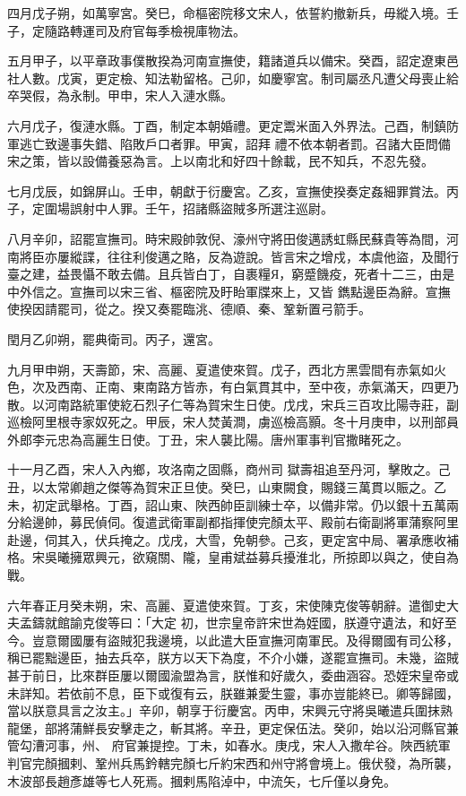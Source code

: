 \begin{pinyinscope}
 四月戊子朔，如萬寧宮。癸巳，命樞密院移文宋人，依誓約撤新兵，毋縱入境。壬子，定隨路轉運司及府官每季檢視庫物法。



 五月甲子，以平章政事僕散揆為河南宣撫使，籍諸道兵以備宋。癸酉，詔定遼東邑社人數。戊寅，更定檢、知法勒留格。己卯，如慶寧宮。制司屬丞凡遭父母喪止給卒哭假，為永制。甲申，宋人入漣水縣。



 六月戊子，復漣水縣。丁酉，制定本朝婚禮。更定鬻米面入外界法。己酉，制鎮防軍逃亡致邊事失錯、陷敗戶口者罪。甲寅，詔拜
 禮不依本朝者罰。召諸大臣問備宋之策，皆以設備養惡為言。上以南北和好四十餘載，民不知兵，不忍先發。



 七月戊辰，如錦屏山。壬申，朝獻于衍慶宮。乙亥，宣撫使揆奏定姦細罪賞法。丙子，定圍場誤射中人罪。壬午，招諸縣盜賊多所選注巡尉。



 八月辛卯，詔罷宣撫司。時宋殿帥敦倪、濠州守將田俊邁誘虹縣民蘇貴等為間，河南將臣亦屢縱諜，往往利俊邁之賂，反為遊說。皆言宋之增戍，本虞他盜，及聞行臺之建，益畏懾不敢去備。且兵皆白丁，自裹糧Я，窮蹙饑疫，死者十二三，由是中外信之。宣撫司以宋三省、樞密院及盱眙軍牒來上，又皆
 鐫點邊臣為辭。宣撫使揆因請罷司，從之。揆又奏罷臨洮、德順、秦、鞏新置弓箭手。



 閏月乙卯朔，罷典衛司。丙子，還宮。



 九月甲申朔，天壽節，宋、高麗、夏遣使來賀。戊子，西北方黑雲間有赤氣如火色，次及西南、正南、東南路方皆赤，有白氣貫其中，至中夜，赤氣滿天，四更乃散。以河南路統軍使紇石烈子仁等為賀宋生日使。戊戌，宋兵三百攻比陽寺莊，副巡檢阿里根寺家奴死之。甲辰，宋人焚黃澗，虜巡檢高顥。冬十月庚申，以刑部員外郎李元忠為高麗生日使。丁丑，宋人襲比陽。唐州軍事判官撒睹死之。



 十一月乙酉，宋人入內鄉，攻洛南之固縣，商州司
 獄壽祖追至丹河，擊敗之。己丑，以太常卿趙之傑等為賀宋正旦使。癸巳，山東闕食，賜錢三萬貫以賑之。乙未，初定武舉格。丁酉，詔山東、陜西帥臣訓練士卒，以備非常。仍以銀十五萬兩分給邊帥，募民偵伺。復遣武衛軍副都指揮使完顏太平、殿前右衛副將軍蒲察阿里赴邊，伺其入，伏兵掩之。戊戌，大雪，免朝參。己亥，更定宮中局、署承應收補格。宋吳曦擁眾興元，欲窺關、隴，皇甫斌益募兵擾淮北，所掠即以與之，使自為戰。



 六年春正月癸未朔，宋、高麗、夏遣使來賀。丁亥，宋使陳克俊等朝辭。遣御史大夫孟鑄就館諭克俊等曰：「大定
 初，世宗皇帝許宋世為姪國，朕遵守遺法，和好至今。豈意爾國屢有盜賊犯我邊境，以此遣大臣宣撫河南軍民。及得爾國有司公移，稱已罷黜邊臣，抽去兵卒，朕方以天下為度，不介小嫌，遂罷宣撫司。未幾，盜賊甚于前日，比來群臣屢以爾國渝盟為言，朕惟和好歲久，委曲涵容。恐姪宋皇帝或未詳知。若依前不息，臣下或復有云，朕雖兼愛生靈，事亦豈能終已。卿等歸國，當以朕意具言之汝主。」辛卯，朝享于衍慶宮。丙申，宋興元守將吳曦遣兵圍抹熟龍堡，部將蒲鮮長安擊走之，斬其將。辛丑，更定保伍法。癸卯，始以沿河縣官兼管勾漕河事，州、
 府官兼提控。丁未，如春水。庚戌，宋人入撒牟谷。陜西統軍判官完顏摑剌、鞏州兵馬鈐轄完顏七斤約宋西和州守將會境上。俄伏發，為所襲，木波部長趙彥雄等七人死焉。摑剌馬陷淖中，中流矢，七斤僅以身免。




\end{pinyinscope}
